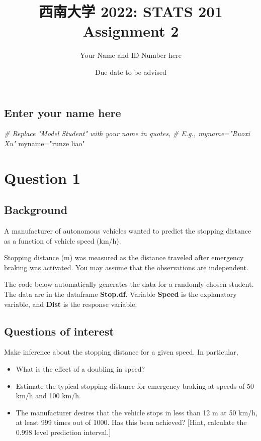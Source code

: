 \documentclass[
]{article}
\title{西南大学 2022: STATS 201 Assignment 2}
\author{Your Name and ID Number here}
\date{Due date to be advised}
\newenvironment{Shaded}{\begin{snugshade}}{\end{snugshade}}
\newcommand{\CommentTok}[1]{\textcolor[rgb]{0.56,0.35,0.01}{\textit{#1}}}
\newcommand{\NormalTok}[1]{#1}
\newcommand{\OtherTok}[1]{\textcolor[rgb]{0.56,0.35,0.01}{#1}}
\newcommand{\StringTok}[1]{\textcolor[rgb]{0.31,0.60,0.02}{#1}}
\providecommand{\tightlist}{%
  \setlength{\itemsep}{0pt}\setlength{\parskip}{0pt}}
\begin{document}
\maketitle

\hypertarget{enter-your-name-here}{%
\subsection{Enter your name here}\label{enter-your-name-here}}

\begin{Shaded}
\begin{Highlighting}[]
\CommentTok{\# Replace "Model Student" with your name in quotes, }
\CommentTok{\# E.g., myname="Ruoxi Xu"}
\NormalTok{myname}\OtherTok{=}\StringTok{"runze liao"}
\end{Highlighting}
\end{Shaded}

\hypertarget{question-1}{%
\section{Question 1}\label{question-1}}

\hypertarget{background}{%
\subsection{Background}\label{background}}

A manufacturer of autonomous vehicles wanted to predict the stopping
distance as a function of vehicle speed (km/h).

Stopping distance (m) was measured as the distance traveled after
emergency braking was activated. You may assume that the observations
are independent.

The code below automatically generates the data for a randomly chosen
student. The data are in the dataframe \textbf{Stop.df}. Variable
\textbf{Speed} is the explanatory variable, and \textbf{Dist} is the
response variable.

\hypertarget{questions-of-interest}{%
\subsection{Questions of interest}\label{questions-of-interest}}

Make inference about the stopping distance for a given speed. In
particular,

\begin{itemize}
\tightlist
\item
  What is the effect of a doubling in speed?
\item
  Estimate the typical stopping distance for emergency braking at speeds
  of 50 km/h and 100 km/h.
\item
  The manufacturer desires that the vehicle stops in less than 12 m at
  50 km/h, at least 999 times out of 1000. Has this been achieved?
  {[}Hint, calculate the 0.998 level prediction interval.{]}
\end{itemize}
\end{document}
